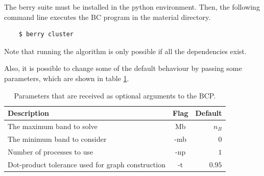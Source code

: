 \documentclass[a4paper,12pt]{report}
\begin{document}
\begin{appendices}
\begin{table}[H]
\begin{tabular}{lr}
        \hline
    \end{tabular}
\end{table}

The berry suite must be installed in the python environment. Then, the following command line executes the BC program in the material directory.

\begin{verbatim}
    $ berry cluster
\end{verbatim}

Note that running the algorithm is only possible if all the dependencies exist.

Also, it is possible to change some of the default behaviour by passing some parameters, which are shown in table \ref{tab:options}.

\begin{table}[H]
    \center
    \caption{Parameters that are received as optional arguments to the BCP.}\label{tab:options}
    \begin{tabular}{lcr}
        \hline
        Description & Flag & Default \\
        \hline
        The maximum band to solve  & Mb & $n_B$\\
        The minimum band to consider & -mb & $0$\\
        Number of processes to use & -np & $1$\\
        Dot-product tolerance used for graph construction & -t & $0.95$\\

        \hline
    \end{tabular}
\end{table}



\end{appendices}
\end{document}
